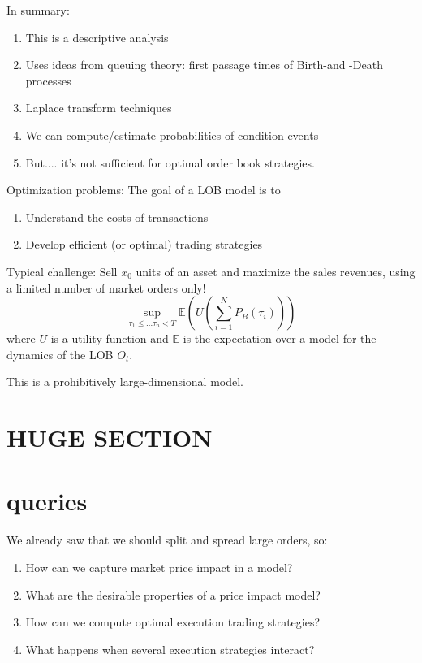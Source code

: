 \documentclass[twocolumn,openany]{book}
\begin{document}
In summary:
\begin{enumerate}
	\item This is a descriptive analysis
	\item Uses ideas from queuing theory: first passage times of Birth-and -Death processes
	\item Laplace transform techniques
	\item We can compute/estimate probabilities of condition events
	\item But.... it's not sufficient for optimal order book strategies.
\end{enumerate}

Optimization problems: The goal of a LOB model is to
\begin{enumerate}
	\item Understand the costs of transactions
	\item Develop efficient (or optimal) trading strategies
\end{enumerate}

Typical challenge: Sell $x_0$ units of an asset and maximize the sales revenues, using a limited number of market orders only!
\begin{equation}
	\sup_{\tau_1 \leq ... \tau_n < T} \mathbb{E}(U(\sum_{i=1}^N P_B(\tau_i)))
\end{equation}
where $U$ is a utility function and $\mathbb{E}$ is the expectation over a model for the dynamics of the LOB $O_t$.

This is a prohibitively large-dimensional model.

\section{HUGE SECTION}
\section{queries}
We already saw that we should split and spread large orders, so:
\begin{enumerate}
	\item How can we capture market price impact in a model?
	\item What are the desirable properties of a price impact model?
	\item How can we compute optimal execution trading strategies?
	\item What happens when several execution strategies interact?
\end{enumerate}
\end{document}
